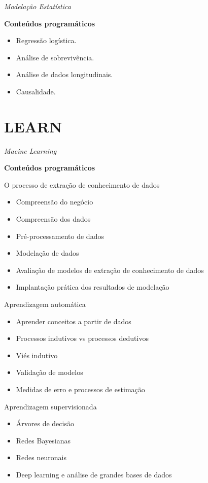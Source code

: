 \documentclass[]{book}
\providecommand{\tightlist}{%
  \setlength{\itemsep}{0pt}\setlength{\parskip}{0pt}}
\begin{document}
\emph{Modelação Estatística}

\textbf{Conteúdos programáticos}

\begin{itemize}
\tightlist
\item
  Regressão logística.
\item
  Análise de sobrevivência.
\item
  Análise de dados longitudinais.
\item
  Causalidade.
\end{itemize}

\hypertarget{learn}{%
\chapter{LEARN}\label{learn}}

\emph{Macine Learning}

\textbf{Conteúdos programáticos}

O processo de extração de conhecimento de dados

\begin{itemize}
\tightlist
\item
  Compreensão do negócio
\item
  Compreensão dos dados
\item
  Pré-processamento de dados
\item
  Modelação de dados
\item
  Avaliação de modelos de extração de conhecimento de dados
\item
  Implantação prática dos resultados de modelação
\end{itemize}

Aprendizagem automática

\begin{itemize}
\tightlist
\item
  Aprender conceitos a partir de dados
\item
  Processos indutivos vs processos dedutivos
\item
  Viés indutivo
\item
  Validação de modelos
\item
  Medidas de erro e processos de estimação
\end{itemize}

Aprendizagem supervisionada

\begin{itemize}
\tightlist
\item
  Árvores de decisão
\item
  Redes Bayesianas
\item
  Redes neuronais
\item
  Deep learning e análise de grandes bases de dados
\end{itemize}
\end{document}
